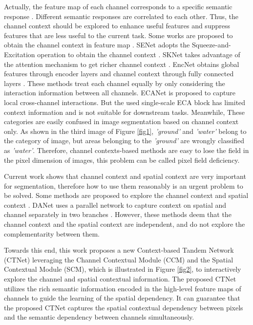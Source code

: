\documentclass[10pt,journal,cspaper,compsoc]{IEEEtran}
\begin{document}
Actually, the feature map of each channel corresponds to a specific semantic response \cite{fu2020contextual, ni2019raunet}. Different semantic responses are correlated to each other. Thus, the channel context should be explored to enhance useful features and suppress features that are less useful to the current task. Some works are proposed to obtain the channel context in feature map \cite{woo2018cbam, hu2018squeeze, li2019selective}. SENet adopts the Squeeze-and-Excitation operation to obtain the channel context \cite{hu2018squeeze}. SKNet takes advantage of the attention mechanism to get richer channel context \cite{li2019selective}. EncNet obtains global features through encoder layers and channel context through fully connected layers \cite{zhang2018context}. These methods treat each channel equally by only considering the interaction information between all channels. ECANet \cite{wang2020eca} is proposed to capture local cross-channel interactions. But the used single-scale ECA block has limited context information and is not suitable for downstream tasks. Meanwhile, These categories are easily confused in image segmentation based on channel context only. As shown in the third image of Figure \ref{fig1}, \textit{'ground'} and \textit{'water'} belong to the category of image, but  areas belonging to the \textit{'ground'} are wrongly classified as \textit{'water'}. Therefore, channel contexts-based methods are easy to lose the field in the pixel dimension of images, this problem can be called pixel field deficiency. 
	
Current work shows that channel context and spatial context are very important for segmentation, therefore how to use them reasonably is an urgent problem to be solved. Some methods are proposed to explore the channel context and spatial context \cite{fu2019dual, woo2018cbam}. DANet uses a parallel network to capture context on spatial and channel separately in two branches \cite{fu2019dual}. However, these methods deem that the channel context and the spatial context are independent, and do not explore the complementarity between them.
	
Towards this end, this work proposes a new Context-based Tandem Network (CTNet) leveraging the Channel Contextual Module (CCM) and the Spatial Contextual Module (SCM), which is illustrated in Figure \ref{fig2}, to interactively explore the channel and spatial contextual information. The proposed CTNet utilizes the rich semantic information encoded in the high-level feature maps of channels to guide the learning of the spatial dependency. It can guarantee that the proposed CTNet captures the spatial contextual dependency between pixels and the semantic dependency between channels simultaneously.
\end{document}
